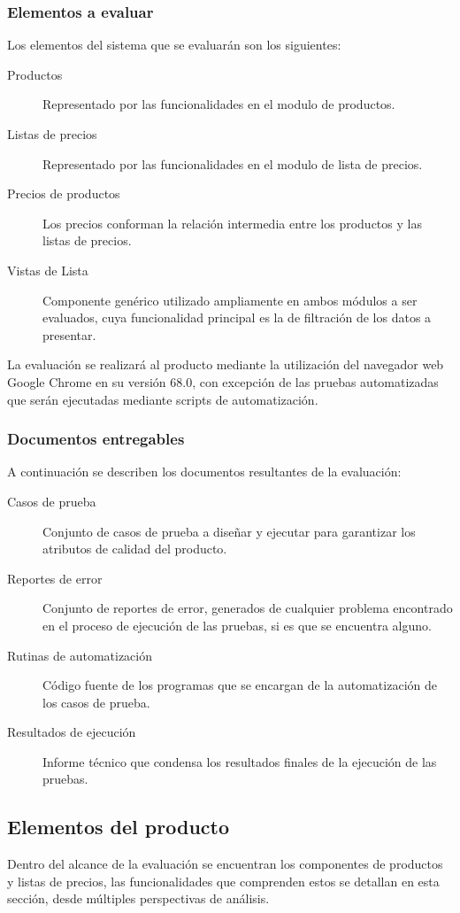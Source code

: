 \subsubsection{Elementos a evaluar}
Los elementos del sistema que se evaluarán son los siguientes:

\begin{description}
\item [Productos] Representado por las funcionalidades en el modulo de productos.
\item [Listas de precios] Representado por las funcionalidades en el modulo de
    lista de precios.
\item [Precios de productos] Los precios conforman la relación intermedia entre
    los productos y las listas de precios.
\item [Vistas de Lista] Componente genérico utilizado ampliamente en ambos
    módulos a ser evaluados, cuya funcionalidad principal es la de filtración de
    los datos a presentar.
\end{description}

La evaluación se realizará al producto mediante la utilización del navegador
web Google Chrome en su versión 68.0, con excepción de las pruebas automatizadas
que serán ejecutadas mediante scripts de automatización.

\subsubsection{Documentos entregables}
A continuación se describen los documentos resultantes de la evaluación:

\begin{description}
\item [Casos de prueba] Conjunto de casos de prueba a diseñar y
    ejecutar para garantizar los atributos de calidad del producto.
\item [Reportes de error] Conjunto de reportes de error, generados de
    cualquier problema encontrado en el proceso de ejecución de las pruebas, si
    es que se encuentra alguno.
\item [Rutinas de automatización] Código fuente de los programas que se encargan
    de la automatización de los casos de prueba.
\item [Resultados de ejecución] Informe técnico que condensa los resultados
    finales de la ejecución de las pruebas.
\end{description}

\subsection{Elementos del producto}
Dentro del alcance de la evaluación se encuentran los componentes de productos
y listas de precios, las funcionalidades que comprenden estos se detallan en
esta sección, desde múltiples perspectivas de análisis.

